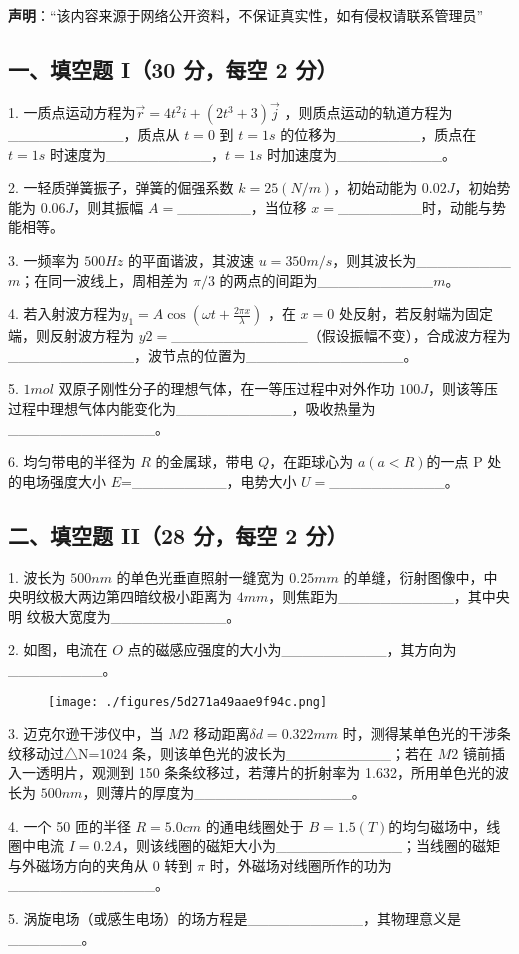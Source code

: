 
\textbf{声明}：“该内容来源于网络公开资料，不保证真实性，如有侵权请联系管理员”

\subsection{一、填空题 I（30 分，每空 2 分）}
1. 一质点运动方程为$\vec{r}=4t^2i+(2t^3+3)\vec{j}$ ，则质点运动的轨道方程为___________，质点从 $t=0$ 到 $t=1s$ 的位移为________，质点在 $t=1s$ 时速度为__________，$t=1s$ 时加速度为__________。

2. 一轻质弹簧振子，弹簧的倔强系数 $k=25(N/m)$，初始动能为 $0.02J$，初始势能为 $0.06J$，则其振幅 $A=$_______，当位移 $x=$________时，动能与势能相等。

3. 一频率为 $500Hz$ 的平面谐波，其波速 $u=350m/s$，则其波长为_________$m$；在同一波线上，周相差为 $\pi/3$ 的两点的间距为___________$m$。

4. 若入射波方程为$y_1=A\cos(\omega t+\frac{2\pi x}{\lambda})$ ，在 $x=0$ 处反射，若反射端为固定端，则反射波方程为 $y2=$_____________（假设振幅不变），合成波方程为____________，波节点的位置为_______________。

5. $1mol$ 双原子刚性分子的理想气体，在一等压过程中对外作功 $100J$，则该等压
过程中理想气体内能变化为___________，吸收热量为______________。

6. 均匀带电的半径为 $R$ 的金属球，带电 $Q$，在距球心为 $a(a<R)$的一点 P 处
的电场强度大小 $E$=_________，电势大小 $U=$___________。
\subsection{二、填空题 II（28 分，每空 2 分）}
1. 波长为 $500nm$ 的单色光垂直照射一缝宽为 $0.25mm$ 的单缝，衍射图像中，中
央明纹极大两边第四暗纹极小距离为 $4mm$，则焦距为___________，其中央明
纹极大宽度为___________。

2. 如图，电流在 $O$ 点的磁感应强度的大小为__________，其方向为_________。
\begin{figure}[ht]
\centering
\texttt{[image: ./figures/5d271a49aae9f94c.png]}
\caption{} \label{fig_NJUB07_1}
\end{figure}
3. 迈克尔逊干涉仪中，当 $M2$ 移动距离$\delta d=0.322mm$ 时，测得某单色光的干涉条纹移动过△N=1024 条，则该单色光的波长为__________；若在 $M2$ 镜前插入一透明片，观测到 150 条条纹移过，若薄片的折射率为 1.632，所用单色光的波长为 $500nm$，则薄片的厚度为_______________。

4. 一个 50 匝的半径 $R=5.0cm$ 的通电线圈处于 $B=1.5(T)$的均匀磁场中，线圈中电流 $I=0.2A$，则该线圈的磁矩大小为____________；当线圈的磁矩与外磁场方向的夹角从 0 转到 $\pi$ 时，外磁场对线圈所作的功为______________。

5. 涡旋电场（或感生电场）的场方程是___________，其物理意义是_______。